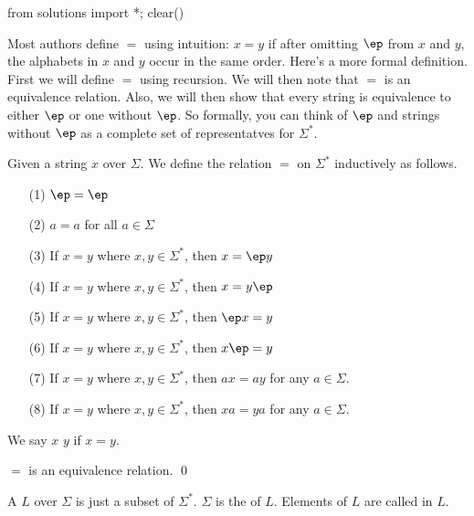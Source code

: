 \begin{python0}
from solutions import *; clear()
\end{python0}

Most authors define $=$ using intuition: $x=y$ if after omitting
$\ep$ from $x$ and $y$, the alphabets in $x$ and $y$ occur in the
same order. Here's a more formal definition. First we will define
$=$ using recursion. We will then note that $=$ is an equivalence
relation. Also, we will then show that every string is equivalence
to either $\ep$ or one without $\ep$. So formally, you can think of
$\ep$ and strings without $\ep$ as a complete set of representatves
for $\Sigma^*$.

\begin{defn}
Given a string $x$ over $\Sigma$. We define the relation $=$ on
$\Sigma^*$ inductively as follows.
\begin{itemize}
\item[(1)] $\ep = \ep$
\item[(2)] $a = a$ for all $a \in \Sigma$
\item[(3)] If $x = y$ where $x,y \in \Sigma^*$, then $x = \ep y$
\item[(4)] If $x = y$ where $x,y \in \Sigma^*$, then $x = y \ep$
\item[(5)] If $x = y$ where $x,y \in \Sigma^*$, then $\ep x = y$
\item[(6)] If $x = y$ where $x,y \in \Sigma^*$, then $x \ep = y$
\item[(7)] If $x = y$ where $x,y \in \Sigma^*$, then $ax = ay$ for any $a \in \Sigma$.
\item[(8)] If $x = y$ where $x,y \in \Sigma^*$, then $xa = ya$ for any $a \in \Sigma$.
\end{itemize}
We say $x$  $y$
if $x=y$.
\end{defn}







\newpage
\begin{prop}
$=$ is an equivalence relation.
\qed
\end{prop}



\newpage
\begin{defn}
  A
  $L$ over $\Sigma$ is just a subset of $\Sigma^*$.
  $\Sigma$ is the
  of $L$.
  Elements of $L$ are called
  \sidebarskip{12pt}
  in $L$.
\end{defn}
